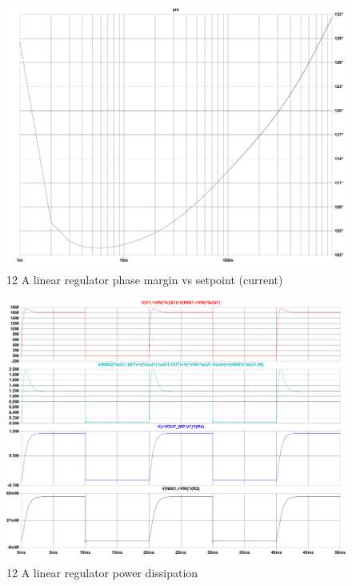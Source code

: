 \begin{figure}[h!]
    \centering
    \includegraphics[scale=0.3]{LT3080-1_Phase-margin_VS_setpoint.pdf}
    \caption{12 A linear regulator phase margin vs setpoint (current)}
    \label{fig:LT3080-1_Phase-margin_VS_setpoint}
\end{figure}

\begin{figure}[h!]
    \centering
    \includegraphics[scale=0.3]{LT3080-1_PowerDissipation.pdf}
    \caption{12 A linear regulator power dissipation}
    \label{fig:LT3080-1_PowerDissipation}
\end{figure}

